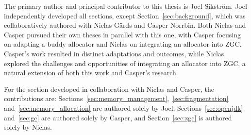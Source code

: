 
The primary author and principal contributor to this thesis is Joel Sikström. Joel independently developed all sections, except Section~\ref{sec:background}, which was collaboratively authored with Niclas Gärds and Casper Norrbin. Both Niclas and Casper pursued their own theses in parallel with this one, with Casper focusing on adapting a buddy allocator and Niclas on integrating an allocator into ZGC. Casper's work resulted in distinct adaptations and outcomes, while Niclas explored the challenges and opportunities of integrating an allocator into ZGC, a natural extension of both this work and Casper's research.

For the section developed in collaboration with Niclas and Casper, the contributions are: Sections~\ref{sec:memory_management},~\ref{sec:fragmentation} and~\ref{sec:memory_allocation} are authored solely by Joel, Sections~\ref{sec:openjdk} and~\ref{sec:gc} are authored solely by Casper, and Section~\ref{sec:zgc} is authored solely by Niclas.

